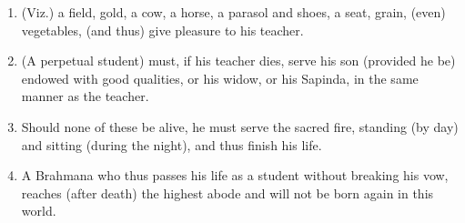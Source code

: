 \begin{enumerate}
\item (Viz.) a field, gold, a cow, a horse, a parasol and shoes, a seat, grain, (even) vegetables, (and thus) give pleasure to his teacher.
\item (A perpetual student) must, if his teacher dies, serve his son (provided he be) endowed with good qualities, or his widow, or his Sapinda, in the same manner as the teacher.
\item Should none of these be alive, he must serve the sacred fire, standing (by day) and sitting (during the night), and thus finish his life.
\item A Brahmana who thus passes his life as a student without breaking his vow, reaches (after death) the highest abode and will not be born again in this world.
\end{enumerate}
